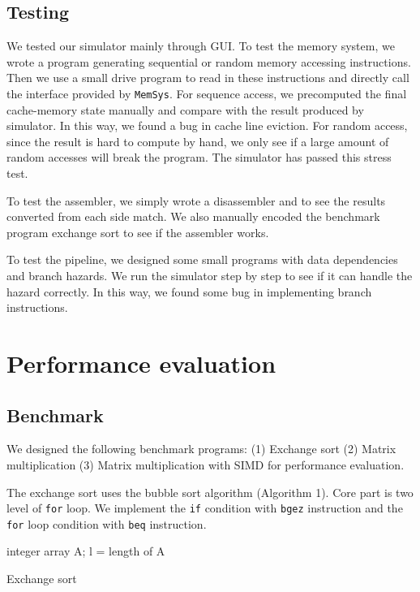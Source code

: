 \documentclass{sig-alternate}
\begin{document}
\subsection{Testing}
We tested our simulator mainly through GUI. To test the memory system, we wrote a program generating sequential or random memory accessing instructions. Then we use a small drive program to read in these instructions and directly call the interface provided by \texttt{MemSys}. For sequence access, we precomputed the final cache-memory state manually and compare with the result produced by simulator. In this way, we found a bug in cache line eviction. For random access, since the result is hard to compute by hand, we only see if a large amount of random accesses will break the program. The simulator has passed this stress test.

To test the assembler, we simply wrote a disassembler and to see the results converted from each side match. We also manually encoded the benchmark program exchange sort to see if the assembler works.
 
To test the pipeline, we designed some small programs with data dependencies and branch hazards. We run the simulator step by step to see if it can handle the hazard correctly. In this way, we found some bug in implementing branch instructions.

\section{Performance evaluation}
\subsection{Benchmark}
We designed the following benchmark programs: (1) Exchange sort (2) Matrix multiplication (3) Matrix multiplication with SIMD for performance evaluation. 

The exchange sort uses the bubble sort algorithm (Algorithm 1). Core part is two level of \texttt{for} loop. We implement the \texttt{if} condition with \texttt{bgez} instruction and the \texttt{for} loop condition with \texttt{beq} instruction.

\begin{algorithm}[h]
\SetAlgoLined
 integer array A; l = length of A\;
\caption{Exchange sort}
\end{algorithm}
\end{document}
